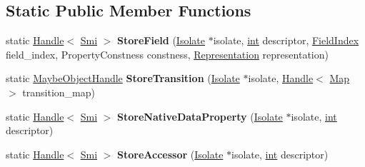 \subsection*{Static Public Member Functions}
\begin{DoxyCompactItemize}
\item 
\mbox{\label{classv8_1_1internal_1_1StoreHandler_a5e48a5230f15ecfad678320d08c4e85f}} 
static \mbox{\hyperlink{classv8_1_1internal_1_1Handle}{Handle}}$<$ \mbox{\hyperlink{classv8_1_1internal_1_1Smi}{Smi}} $>$ {\bfseries Store\+Field} (\mbox{\hyperlink{classv8_1_1internal_1_1Isolate}{Isolate}} $\ast$isolate, \mbox{\hyperlink{classint}{int}} descriptor, \mbox{\hyperlink{classv8_1_1internal_1_1FieldIndex}{Field\+Index}} field\+\_\+index, Property\+Constness constness, \mbox{\hyperlink{classv8_1_1internal_1_1Representation}{Representation}} representation)
\item 
\mbox{\label{classv8_1_1internal_1_1StoreHandler_a6b22fdda926710b720c446ab3bf90e73}} 
static \mbox{\hyperlink{classv8_1_1internal_1_1MaybeObjectHandle}{Maybe\+Object\+Handle}} {\bfseries Store\+Transition} (\mbox{\hyperlink{classv8_1_1internal_1_1Isolate}{Isolate}} $\ast$isolate, \mbox{\hyperlink{classv8_1_1internal_1_1Handle}{Handle}}$<$ \mbox{\hyperlink{classv8_1_1internal_1_1Map}{Map}} $>$ transition\+\_\+map)
\item 
\mbox{\label{classv8_1_1internal_1_1StoreHandler_a57e97e408250e9b808def49ae6a54da3}} 
static \mbox{\hyperlink{classv8_1_1internal_1_1Handle}{Handle}}$<$ \mbox{\hyperlink{classv8_1_1internal_1_1Smi}{Smi}} $>$ {\bfseries Store\+Native\+Data\+Property} (\mbox{\hyperlink{classv8_1_1internal_1_1Isolate}{Isolate}} $\ast$isolate, \mbox{\hyperlink{classint}{int}} descriptor)
\item 
\mbox{\label{classv8_1_1internal_1_1StoreHandler_ac0805aa379f770a90a5149717a6bfde1}} 
static \mbox{\hyperlink{classv8_1_1internal_1_1Handle}{Handle}}$<$ \mbox{\hyperlink{classv8_1_1internal_1_1Smi}{Smi}} $>$ {\bfseries Store\+Accessor} (\mbox{\hyperlink{classv8_1_1internal_1_1Isolate}{Isolate}} $\ast$isolate, \mbox{\hyperlink{classint}{int}} descriptor)
\item 
\mbox{\label{classv8_1_1internal_1_1StoreHandler_a12749e7387070200898f75822c23bd28}} 

\end{DoxyCompactItemize}
